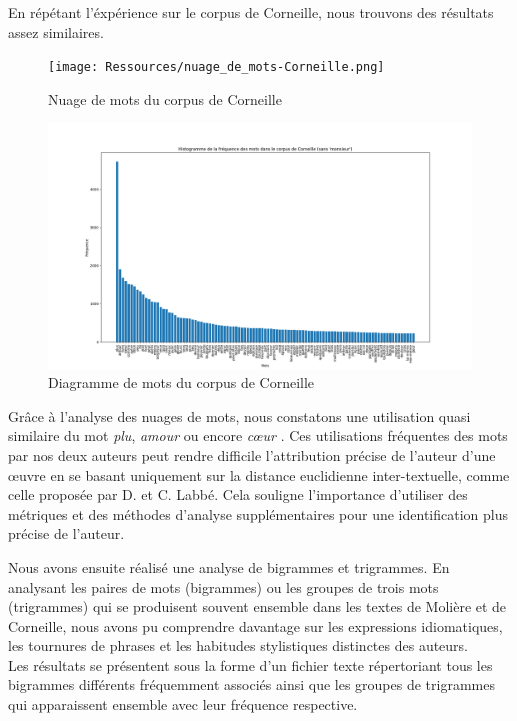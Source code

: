   \vspace{\baselineskip}

\hspace{0,5cm}En répétant l'éxpérience sur le corpus de Corneille, nous trouvons
des résultats assez similaires.

\begin{figure}[htbp]
  \centering
  \texttt{[image: Ressources/nuage\_de\_mots-Corneille.png]}
  \caption{Nuage de mots du corpus de Corneille}
  \label{fig:images}
\end{figure}

\begin{figure}[htbp]
  \centering
  \includegraphics[width=18cm]{Ressources/corneille_digramme.png}
  \caption{Diagramme de mots du corpus de Corneille}
  \label{fig:images}
\end{figure}

\newpage

\hspace{0,5cm}Grâce à l'analyse des nuages de mots, nous constatons une utilisation
quasi similaire du mot \textit{plu}, \textit{amour} ou encore \textit{cœur} .
Ces utilisations fréquentes des mots par nos deux auteurs peut rendre difficile
l'attribution précise de l'auteur d'une œuvre en se basant uniquement sur la
distance euclidienne inter-textuelle, comme celle proposée par D. et C. Labbé.
Cela souligne l'importance d'utiliser des métriques et des méthodes d'analyse
supplémentaires pour une identification plus précise de l'auteur.

\vspace{\baselineskip}

\hspace{0,5cm}Nous avons ensuite réalisé une analyse de bigrammes et trigrammes. En analysant
les paires de mots (bigrammes) ou les groupes de trois mots (trigrammes) qui se
produisent souvent ensemble dans les textes de Molière et de Corneille, nous
avons pu comprendre davantage sur les expressions idiomatiques, les tournures de
phrases et les habitudes stylistiques distinctes des auteurs.
\\Les résultats se présentent sous la forme d'un fichier texte répertoriant tous
les bigrammes différents fréquemment associés ainsi que les groupes de
trigrammes qui apparaissent ensemble avec leur fréquence respective.
	
